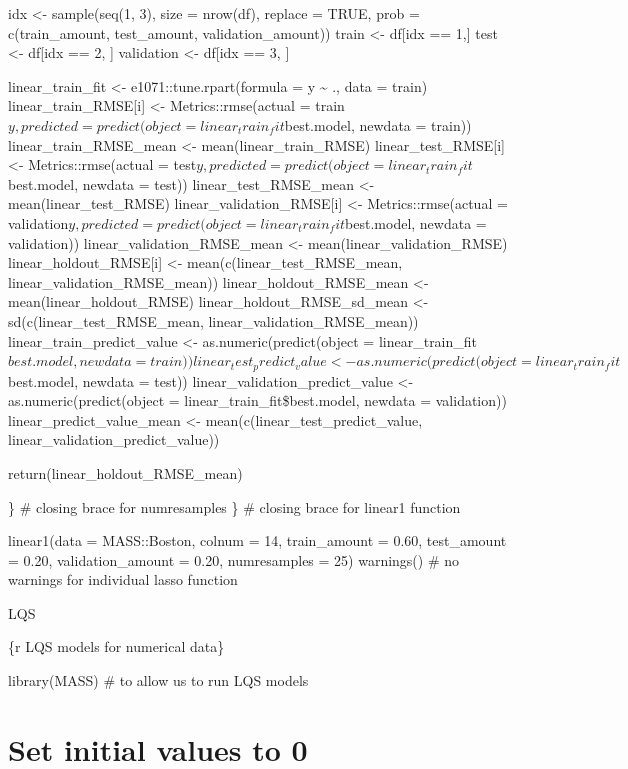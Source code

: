 \documentclass[
]{book}
\begin{document}
idx \textless- sample(seq(1, 3), size = nrow(df), replace = TRUE, prob =
c(train\_amount, test\_amount, validation\_amount)) train \textless- df{[}idx == 1,{]} test \textless- df{[}idx == 2, {]} validation \textless- df{[}idx == 3, {]}

linear\_train\_fit \textless- e1071::tune.rpart(formula = y \textasciitilde{} ., data = train)
linear\_train\_RMSE{[}i{]} \textless- Metrics::rmse(actual =
train\(y, predicted = predict(object = linear_train_fit\)best.model,
newdata = train)) linear\_train\_RMSE\_mean \textless- mean(linear\_train\_RMSE)
linear\_test\_RMSE{[}i{]} \textless- Metrics::rmse(actual =
test\(y, predicted = predict(object = linear_train_fit\)best.model,
newdata = test)) linear\_test\_RMSE\_mean \textless- mean(linear\_test\_RMSE)
linear\_validation\_RMSE{[}i{]} \textless- Metrics::rmse(actual =
validation\(y, predicted = predict(object = linear_train_fit\)best.model,
newdata = validation)) linear\_validation\_RMSE\_mean \textless-
mean(linear\_validation\_RMSE) linear\_holdout\_RMSE{[}i{]} \textless-
mean(c(linear\_test\_RMSE\_mean, linear\_validation\_RMSE\_mean))
linear\_holdout\_RMSE\_mean \textless- mean(linear\_holdout\_RMSE)
linear\_holdout\_RMSE\_sd\_mean \textless- sd(c(linear\_test\_RMSE\_mean,
linear\_validation\_RMSE\_mean)) linear\_train\_predict\_value \textless-
as.numeric(predict(object =
linear\_train\_fit\(best.model, newdata = train))
linear_test_predict_value <- as.numeric(predict(object = linear_train_fit\)best.model,
newdata = test)) linear\_validation\_predict\_value \textless-
as.numeric(predict(object = linear\_train\_fit\$best.model, newdata =
validation)) linear\_predict\_value\_mean \textless-
mean(c(linear\_test\_predict\_value, linear\_validation\_predict\_value))

return(linear\_holdout\_RMSE\_mean)

\} \# closing brace for numresamples \} \# closing brace for linear1
function

linear1(data = MASS::Boston, colnum = 14, train\_amount = 0.60,
test\_amount = 0.20, validation\_amount = 0.20, numresamples = 25)
warnings() \# no warnings for individual lasso function

LQS

\{r LQS models for numerical data\}

library(MASS) \# to allow us to run LQS models

\chapter{Set initial values to 0}\label{set-initial-values-to-0-10}
\end{document}
